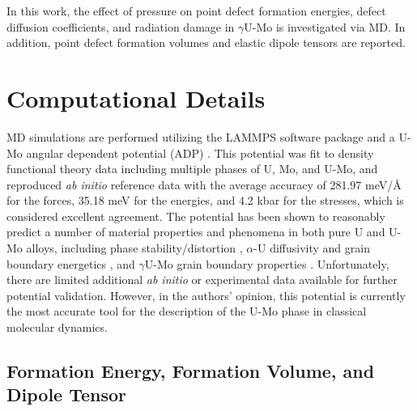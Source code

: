 \documentclass[review]{elsarticle}
\begin{document}
In this work, the effect of pressure on point defect formation energies, defect diffusion coefficients, and radiation damage in $\gamma$U-Mo is investigated via MD. In addition, point defect formation volumes and elastic dipole tensors are reported.

\section{Computational Details}\label{sec2}

MD simulations are performed utilizing the LAMMPS \cite{plimpton1995,LAMMPS} software package and a U-Mo angular dependent potential (ADP) \cite{starikov2018,beelerumoxe}. This potential was fit to density functional theory data including multiple phases of U, Mo, and U-Mo, and reproduced \textit{ab initio} reference data with the average accuracy of 281.97 meV/Å for the forces, 35.18 meV for the energies, and 4.2 kbar for the stresses, which is considered excellent agreement. The potential has been shown to reasonably predict a number of material properties and phenomena in both pure U and U-Mo alloys, including phase stability/distortion  \cite{starikov2018,starikov2023,kolotova2020}, $\alpha$-U diffusivity and grain boundary energetics \cite{wang2023,mahbuba2025}, and $\gamma$U-Mo grain boundary properties \cite{hasan2024}. Unfortunately, there are limited additional \textit{ab initio} or experimental data available for further potential validation. However, in the authors' opinion, this potential is currently the most accurate tool for the description of the U-Mo phase in classical molecular dynamics. 

\subsection{Formation Energy, Formation Volume, and Dipole Tensor}
\end{document}
